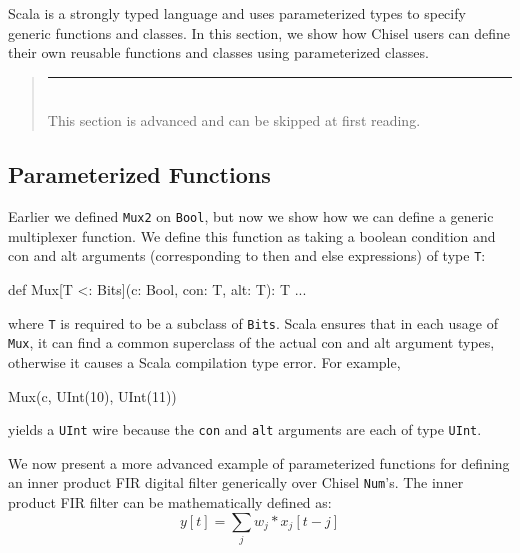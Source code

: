 \documentclass[twocolumn,10pt]{article}
\newenvironment{commentary}
{ \vspace{-0.1in}
  \begin{quotation}
  \noindent
  \small \em
  \rule{\linewidth}{1pt}\\
}
{
  \end{quotation}
}
\def\code#1{{\tt #1}}
\begin{document}
Scala is a strongly typed language and uses parameterized types to specify generic functions and classes.  
In this section, we show how Chisel users can define their own reusable functions and classes using parameterized classes.
\begin{commentary}
This section is advanced and can be skipped at first reading.
\end{commentary}

\subsection{Parameterized Functions}

Earlier we defined \code{Mux2} on \code{Bool}, but now we show how we can define a generic multiplexer function.
We define this function as taking a boolean condition and con and alt arguments (corresponding to then and else expressions) of type \code{T}:

\begin{scala}
def Mux[T <: Bits](c: Bool, con: T, alt: T): T { ... }
\end{scala}

\noindent
where \code{T} is required to be a subclass of \code{Bits}.
Scala ensures that in each usage of \code{Mux}, it can find a common superclass of the actual con and alt argument types, 
otherwise it causes a Scala compilation type error.
For example,

\begin{scala}
Mux(c, UInt(10), UInt(11))
\end{scala}

\noindent
yields a \code{UInt} wire because the \code{con} and \code{alt} arguments are each of type \code{UInt}.

% 
% 

We now present a more advanced example of parameterized functions for defining an inner product FIR digital filter generically over Chisel \code{Num}'s.
The inner product FIR filter can be mathematically defined as:
\begin{equation}
y[t] = \sum_j w_j * x_j[t-j]
\end{equation}
\end{document}
